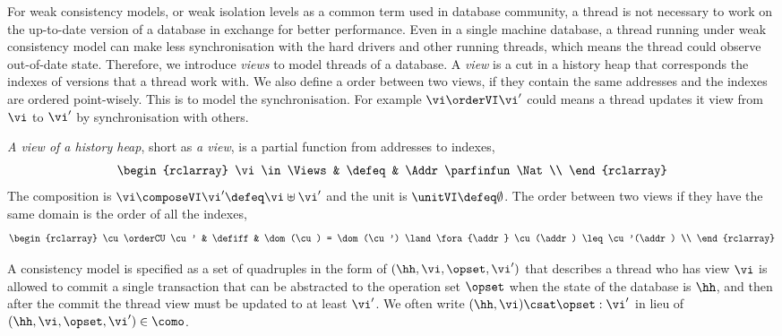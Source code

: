 For weak consistency models, or weak isolation levels as a common term used in database community, a thread is not necessary to work on the up-to-date version of a database in exchange for better performance. 
Even in a single machine database, a thread running under weak consistency model can make less synchronisation with the hard drivers and other running threads, which means the thread could observe out-of-date state.
Therefore, we introduce \emph{views} to model threads of a database.
A \emph{view} is a cut in a history heap that corresponds the indexes of versions that a thread work with.
We also define a order between two views, if they contain the same addresses and the indexes are ordered point-wisely.
This is to model the synchronisation.
For example \( \vi \orderVI \vi' \) could means a thread updates it view from \( \vi \) to \( \vi' \) by synchronisation with others.

\begin{defn}[Views]
\label{def:cuts}
\label{def:views}
\emph{A view of a history heap}, short as \emph{a view}, is a partial function from addresses to indexes,
\[
\begin{rclarray}
    \vi \in \Views & \defeq & \Addr \parfinfun \Nat \\
\end{rclarray}
\]                                                                     
The composition is \( \vi \composeVI \vi' \defeq \vi \uplus \vi'\) and the unit is \( \unitVI \defeq \emptyset\).
The order between two views if they have the same domain is the order of all the indexes, 
\[
\begin{rclarray}
    \cu \orderCU \cu' & \defiff & \dom(\cu) = \dom(\cu') \land \fora{\addr} \cu(\addr) \leq \cu'(\addr) \\
\end{rclarray}
\]
\end{defn}

A consistency model is specified as a set of quadruples in the form of \( ( \hh, \vi, \opset, \vi' ) \) that describes a thread who has view \( \vi \) is allowed to commit a single transaction that can be abstracted to the operation set \( \opset \) when the state of the database is \( \hh \), and then after the commit the thread view must be updated to at least \( \vi' \).
We often write \( (\hh, \vi) \csat \opset : \vi' \) in lieu of \( (\hh, \vi, \opset, \vi') \in \como \).

